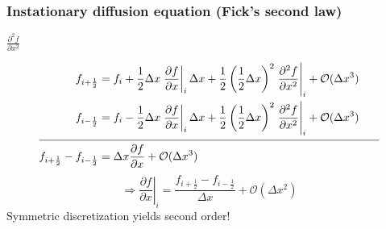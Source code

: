 \documentclass[11pt,table,final,fleqn,xcolor={usenames,dvipsnames,table}]{beamer}
\begin{document}
\begin{frame}
  \frametitle{Instationary diffusion equation (Fick's second law)}
  $\displaystyle \frac{\partial^2f}{\partial x^2}$ \qquad
  \pause
  \begin{align*}
  f_{i+\frac{1}{2}} &= f_i + \frac{1}{2}\Delta x \left. \frac{\partial f}{\partial x}\right|_i \Delta x + \frac{1}{2}\left(\frac{1}{2}\Delta x\right)^2 \left. \frac{\partial^2 f}{\partial x^2} \right|_i +   \mathcal{O}{(\Delta x^3)}& \\
  f_{i-\frac{1}{2}} &= f_i - \frac{1}{2}\Delta x \left. \frac{\partial f}{\partial x}\right|_i \Delta x + \frac{1}{2}\left(\frac{1}{2}\Delta x\right)^2 \left. \frac{\partial^2 f}{\partial x^2} \right|_i +   \mathcal{O}{(\Delta x^3)}& \phantom{+}\\
    \cline{1-3}
    f_{i+\frac{1}{2}} -f_{i-\frac{1}{2}} &= \Delta x \frac{\partial f}{\partial x} + \mathcal{O}{(\Delta x^3)} & 
  \end{align*}
  \pause
  \[
    \Rightarrow \left. \frac{\partial f}{\partial x}\right|_i = \frac{f_{i+\frac{1}{2}} - f_{i-\frac{1}{2}}}{\Delta x} +  \mathcal{O}{(\Delta x^2)}
  \]
  Symmetric discretization yields second order!
\end{frame}
\end{document}
